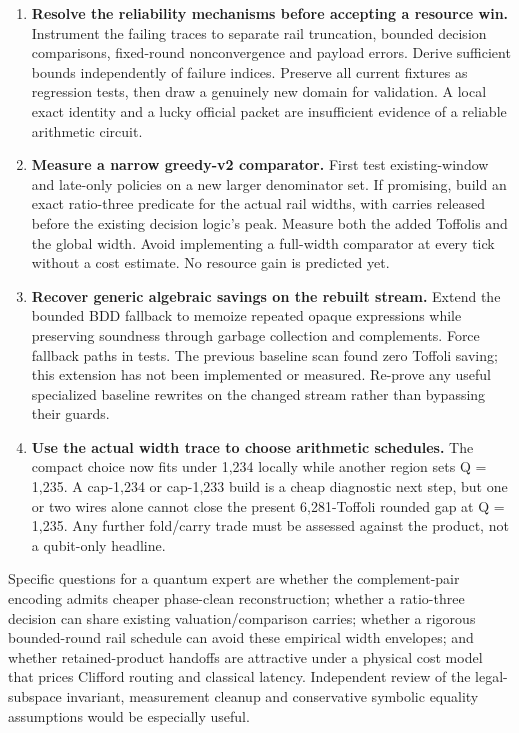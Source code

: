 \documentclass[11pt,letterpaper]{article}
\begin{document}
\begin{enumerate}
\item \textbf{Resolve the reliability mechanisms before accepting a resource win.} Instrument the failing traces to separate rail truncation, bounded decision comparisons, fixed-round nonconvergence and payload errors. Derive sufficient bounds independently of failure indices. Preserve all current fixtures as regression tests, then draw a genuinely new domain for validation. A local exact identity and a lucky official packet are insufficient evidence of a reliable arithmetic circuit.
\item \textbf{Measure a narrow greedy-v2 comparator.} First test existing-window and late-only policies on a new larger denominator set. If promising, build an exact ratio-three predicate for the actual rail widths, with carries released before the existing decision logic's peak. Measure both the added Toffolis and the global width. Avoid implementing a full-width comparator at every tick without a cost estimate. No resource gain is predicted yet.
\item \textbf{Recover generic algebraic savings on the rebuilt stream.} Extend the bounded BDD fallback to memoize repeated opaque expressions while preserving soundness through garbage collection and complements. Force fallback paths in tests. The previous baseline scan found zero Toffoli saving; this extension has not been implemented or measured. Re-prove any useful specialized baseline rewrites on the changed stream rather than bypassing their guards.
\item \textbf{Use the actual width trace to choose arithmetic schedules.} The compact choice now fits under 1,234 locally while another region sets Q = 1,235. A cap-1,234 or cap-1,233 build is a cheap diagnostic next step, but one or two wires alone cannot close the present 6,281-Toffoli rounded gap at Q = 1,235. Any further fold/carry trade must be assessed against the product, not a qubit-only headline.
\end{enumerate}

Specific questions for a quantum expert are whether the complement-pair encoding admits cheaper phase-clean reconstruction; whether a ratio-three decision can share existing valuation/comparison carries; whether a rigorous bounded-round rail schedule can avoid these empirical width envelopes; and whether retained-product handoffs are attractive under a physical cost model that prices Clifford routing and classical latency. Independent review of the legal-subspace invariant, measurement cleanup and conservative symbolic equality assumptions would be especially useful.
\end{document}
